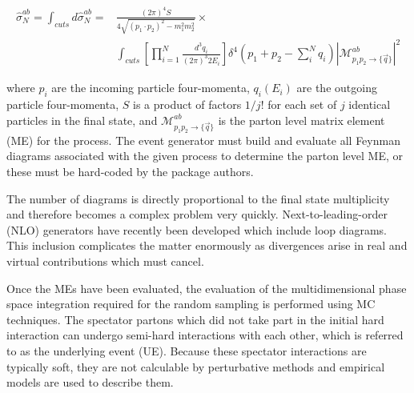 \begin{equation}
\begin{split}\label{eq:event_generation_partonic_cross_section}
\hat{\sigma}_{N}^{ab}=\int_{cuts}d\hat{\sigma}_{N}^{ab}={}&\frac{\left(2\pi\right)^{4}S}{4\sqrt{\left(p_{1}{\cdot}p_{2}\right)^{2}-m_{1}^{2}m_{2}^{2}}}\times \\ &\int_{cuts} \left[\prod_{i=1}^{N}\frac{d^{3}q_{i}}{\left(2\pi\right)^{3}2E_{i}}\right]\delta^{4}\left(p_{1}+p_{2}-\sum_{i}^{N}q_{i}\right)|\mathcal{M}_{p_{1}p_{2}\rightarrow\{\vec{q}\}}^{ab}|^{2}
\end{split}
\end{equation}

where $p_{i}$ are the incoming particle four-momenta, $q_{i}(E_{i})$ are the outgoing particle four-momenta, $S$ is a product of factors $1/j!$ for each set of $j$ identical particles in the final state, and $\mathcal{M}_{p_{1}p_{2}\rightarrow\{\vec{q}\}}^{ab}$ is the parton level matrix element (ME) for the process. The event generator must build and evaluate all Feynman diagrams associated with the given process to determine the parton level ME, or these must be hard-coded by the package authors. 

The number of diagrams is directly proportional to the final state multiplicity and therefore becomes a complex problem very quickly. Next-to-leading-order (NLO) generators have recently been developed which include loop diagrams. This inclusion complicates the matter enormously as divergences arise in real and virtual contributions which must cancel. 

Once the MEs have been evaluated, the evaluation of the multidimensional phase space integration required for the random sampling is performed using MC techniques. The spectator partons which did not take part in the initial hard interaction can undergo semi-hard interactions with each other, which is referred to as the underlying event (UE). Because these spectator interactions are typically soft, they are not calculable by perturbative methods and empirical models are used to describe them.

